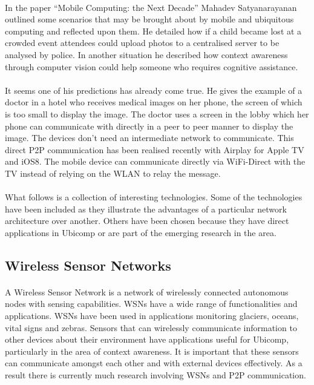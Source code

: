\documentclass[11pt]{amsart}
\begin{document}
\paragraph{}
In the paper ``Mobile Computing: the Next Decade'' Mahadev Satyanarayanan outlined some scenarios that may be brought about by mobile and ubiquitous computing and reflected upon them. He detailed how if a child became lost at a crowded event attendees could upload photos to a centralised server to be analysed by police. In another situation he described how context awareness through computer vision could help someone who requires cognitive assistance.\cite{satyanarayanan2011mobile}
\paragraph{}
It seems one of his predictions has already come true. He gives the example of a doctor in a hotel who receives medical images on her phone, the screen of which is too small to display the image. The doctor uses a screen in the lobby which her phone can communicate with directly in a peer to peer manner to display the image. The devices don't need an intermediate network to communicate. This direct P2P communication has been realised recently with Airplay for Apple TV and iOS8. The mobile device can communicate directly via WiFi-Direct with the TV instead of relying on the WLAN to relay the message.\cite{apple}
\paragraph{}
What follows is a collection of interesting technologies. Some of the technologies have been included as they illustrate the advantages of a particular network architecture over another. Others have been chosen because they have direct applications in Ubicomp or are part of the emerging research in the area.

\subsection{Wireless Sensor Networks}
\paragraph{}
A Wireless Sensor Network is a network of wirelessly connected autonomous nodes with sensing capabilities. WSNs have a wide range of functionalities and applications. WSNs have been used in applications monitoring glaciers, oceans, vital signs and zebras.\cite{DesignSpace} Sensors that can wirelessly communicate information to other devices about their environment have applications useful for Ubicomp, particularly in the area of context awareness. It is important that these sensors can communicate amongst each other and with external devices effectively. As a result there is currently much research involving WSNs and P2P communication.
\end{document}
